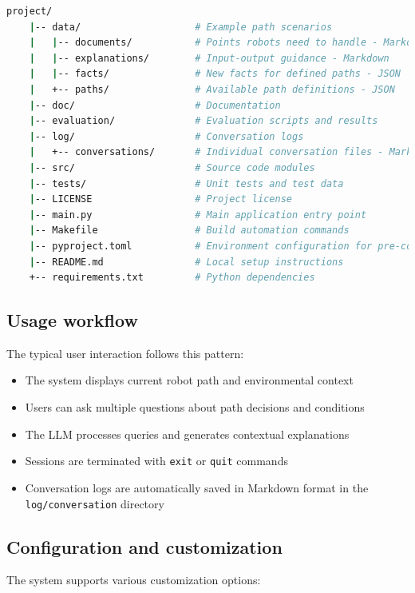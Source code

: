 \begin{lstlisting}[language=bash]
    project/
    |-- data/                    # Example path scenarios
    |   |-- documents/           # Points robots need to handle - Markdown
    |   |-- explanations/        # Input-output guidance - Markdown
    |   |-- facts/               # New facts for defined paths - JSON
    |   +-- paths/               # Available path definitions - JSON
    |-- doc/                     # Documentation
    |-- evaluation/              # Evaluation scripts and results
    |-- log/                     # Conversation logs
    |   +-- conversations/       # Individual conversation files - Markdown
    |-- src/                     # Source code modules
    |-- tests/                   # Unit tests and test data
    |-- LICENSE                  # Project license
    |-- main.py                  # Main application entry point
    |-- Makefile                 # Build automation commands
    |-- pyproject.toml           # Environment configuration for pre-commit
    |-- README.md                # Local setup instructions
    +-- requirements.txt         # Python dependencies
\end{lstlisting}

\subsection{Usage workflow}

The typical user interaction follows this pattern:
\begin{itemize}
    \item The system displays current robot path and environmental context
    \item Users can ask multiple questions about path decisions and conditions
    \item The LLM processes queries and generates contextual explanations
    \item Sessions are terminated with \texttt{exit} or \texttt{quit} commands
    \item Conversation logs are automatically saved in Markdown format in the \texttt{log/conversation} directory
\end{itemize}

\subsection{Configuration and customization}

The system supports various customization options:

